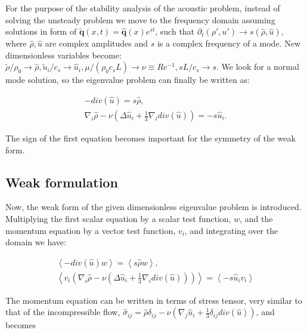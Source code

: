 For the purpose of the stability analysis of the acoustic problem, instead of solving the unsteady problem we move to the frequency domain assuming solutions in form of $\tilde{\mathbf{q}}(x,t) = \hat{\mathbf{q}}(x) e^{st}$, such that $\partial_t (\rho', u') \rightarrow s (\hat{\rho}, \hat{u})$, where $\hat{\rho}, \hat{u}$ are  complex  amplitudes  and $s$ is a complex  frequency  of  a  mode. New dimensionless variables become: $\tilde{\rho}/\rho_0 \rightarrow \hat{\rho}, \tilde{u}_i / c_s \rightarrow \hat{u}_i , \mu/ (\rho_0 c_s L) \rightarrow \nu \equiv Re^{-1}, s L/c_s \rightarrow s $. We  look  for  a  normal mode  solution, so the  eigenvalue problem can finally be written as:

\begin{subequations}
\begin{align}
\label{eq:SpMassCont}
        -div(\hat{u}) = s \hat{\rho}, \\
        \nabla_i \hat{\rho} - \nu \left(\Delta \hat{u}_i + \frac{1}{3} \nabla_i div(\hat{u}) \right) = - s \hat{u}_i .
\end{align}
\label{eq:strViscAc}
\end{subequations}

The sign of the first equation becomes important for the symmetry of the weak form. 

\subsection{Weak formulation}

Now, the weak form of the given dimensionless eigenvalue problem is introduced. Multiplying the first scalar equation by a scalar test function, $w$, and the momentum equation by a vector test function, $v_i$, and integrating over the domain we have:

\begin{subequations}
\begin{align}
        \left< -div(\hat{u}) w \right> =\left< s \hat{\rho} w \right>, \\
        \left< v_i \left( \nabla_i \hat{\rho} - \nu \left(\Delta \hat{u}_i + \frac{1}{3} \nabla_i div(\hat{u}) \right) \right) \right>= \left<- s \hat{u}_i v_i\right>
\end{align}
\end{subequations}

The momentum equation can be written in terms of stress tensor, very similar to that of the incompressible flow, $\hat{\sigma}_{ij} = \hat{\rho} \delta_{ij} - \nu \left( \nabla_j \hat{u}_i + \frac{1}{3} \delta_{ij} div(\hat{u}) \right)$, and becomes

